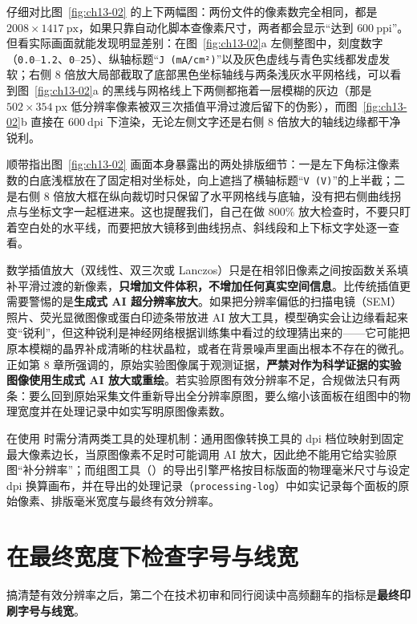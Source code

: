仔细对比图~\ref{fig:ch13-02} 的上下两幅图：两份文件的像素数完全相同，都是 $2008 \times 1417\ \text{px}$，如果只靠自动化脚本查像素尺寸，两者都会显示“达到 $600\ \text{ppi}$”。但看实际画面就能发现明显差别：在图~\ref{fig:ch13-02}a 左侧整图中，刻度数字（\texttt{0.0}–\texttt{1.2}、\texttt{0}–\texttt{25}）、纵轴标题“\texttt{J (mA/cm²)}”以及灰色虚线与青色实线都发虚发软；右侧 8 倍放大局部截取了底部黑色坐标轴线与两条浅灰水平网格线，可以看到图~\ref{fig:ch13-02}a 的黑线与网格线上下两侧都拖着一层模糊的灰边（那是 $502 \times 354\ \text{px}$ 低分辨率像素被双三次插值平滑过渡后留下的伪影），而图~\ref{fig:ch13-02}b 直接在 $600\ \text{dpi}$ 下渲染，无论左侧文字还是右侧 8 倍放大的轴线边缘都干净锐利。

顺带指出图~\ref{fig:ch13-02} 画面本身暴露出的两处排版细节：一是左下角标注像素数的白底浅框放在了固定相对坐标处，向上遮挡了横轴标题“\texttt{V (V)}”的上半截；二是右侧 8 倍放大框在纵向裁切时只保留了水平网格线与底轴，没有把右侧曲线拐点与坐标文字一起框进来。这也提醒我们，自己在做 $800\%$ 放大检查时，不要只盯着空白处的水平线，而要把放大镜移到曲线拐点、斜线段和上下标文字处逐一查看。

数学插值放大（双线性、双三次或 Lanczos）只是在相邻旧像素之间按函数关系填补平滑过渡的新像素，\textbf{只增加文件体积，不增加任何真实空间信息}。比传统插值更需要警惕的是\textbf{生成式 AI 超分辨率放大}。如果把分辨率偏低的扫描电镜（SEM）照片、荧光显微图像或蛋白印迹条带放进 AI 放大工具，模型确实会让边缘看起来变“锐利”，但这种锐利是神经网络根据训练集中看过的纹理猜出来的——它可能把原本模糊的晶界补成清晰的柱状晶粒，或者在背景噪声里画出根本不存在的微孔。正如第 8 章所强调的，原始实验图像属于观测证据，\textbf{严禁对作为科学证据的实验图像使用生成式 AI 放大或重绘}。若实验原图有效分辨率不足，合规做法只有两条：要么回到原始采集文件重新导出全分辨率原图，要么缩小该面板在组图中的物理宽度并在处理记录中如实写明原图像素数。

在使用 \scidraw{} 时需分清两类工具的处理机制：通用图像转换工具的 dpi 档位映射到固定最大像素边长，当原图像素不足时可能调用 AI 放大，因此绝不能用它给实验原图“补分辨率”；而组图工具（）的导出引擎严格按目标版面的物理毫米尺寸与设定 dpi 换算画布，并在导出的处理记录（\texttt{processing-log}）中如实记录每个面板的原始像素、排版毫米宽度与最终有效分辨率。

\section{在最终宽度下检查字号与线宽}

搞清楚有效分辨率之后，第二个在技术初审和同行阅读中高频翻车的指标是\textbf{最终印刷字号与线宽}。

